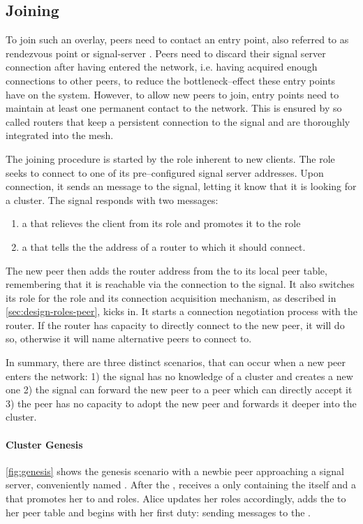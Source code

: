 \subsection{Joining}
To join such an overlay, peers need to contact an entry point, also referred to as rendezvous point or \gls{signal-server} \cite[p.384]{tanenbaum_wetherall_2011}.
Peers need to discard their signal server connection after having entered the network, i.e. having acquired enough connections to other peers, to reduce the bottleneck–effect these entry points have on the system.
However, to allow new peers to join, entry points need to maintain at least one permanent contact to the network. This is ensured by so called \glspl{router} that keep a persistent connection to the signal and are thoroughly integrated into the mesh.

The joining procedure is started by the \newbieRole role inherent to new clients. The \newbieRole role seeks to connect to one of its pre–configured signal server addresses.
Upon connection, it sends an \introduction message to the signal, letting it know that it is looking for a cluster. The signal responds with two messages:
\begin{enumerate}
    \item a \roleUpdate that relieves the client from its \newbieRole role and promotes it to the \peerRole role
    \item a \peerUpdate that tells the \newbieRole the address of a \gls{router} to which it should connect.
\end{enumerate}
The new peer then adds the router address from the \peerUpdate to its local peer table, remembering that it is reachable via the connection to the signal.
It also switches its \newbieRole role for the \peerRole role and its connection acquisition mechanism, as described in \vref{sec:design-roles-peer}, kicks in. It starts a connection negotiation process with the router. If the router has capacity to directly connect to the new peer, it will do so, otherwise it will name alternative peers to connect to.

In summary, there are three distinct scenarios, that can occur when a new peer enters the network: 1) the signal has no knowledge of a cluster and creates a new one 2) the signal can forward the new peer to a \routerRole peer which can directly accept it 3) the \routerRole peer has no capacity to adopt the new peer and forwards it deeper into the cluster.

\paragraph{Cluster Genesis}
\vref{fig:genesis} shows the genesis scenario with a newbie peer \alice approaching a signal server, conveniently named \signal. After the \introduction, \alice receives a \peerUpdate only containing the \signal itself and a \roleUpdate that promotes her to \peerRole and \routerRole roles. Alice updates her roles accordingly, adds the \signal to her peer table and begins with her first \routerRole duty: sending \routerAlive messages to the \signal.

